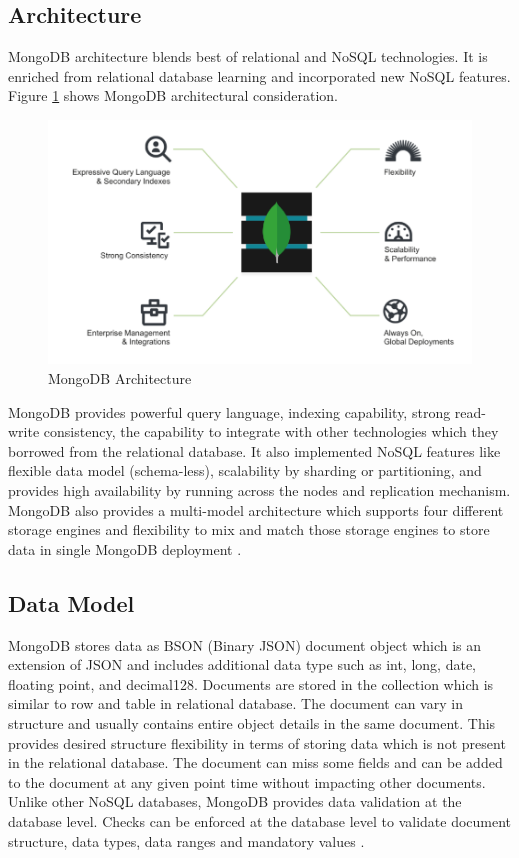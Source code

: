 \documentclass[sigconf]{acmart}
\begin{document}
\subsection{Architecture}
MongoDB architecture blends best of relational and NoSQL technologies. It is enriched from relational database learning and incorporated new NoSQL features.
Figure \ref{f:mongo-arch} shows MongoDB architectural consideration.
\begin{figure}[!ht]
  \centering\includegraphics[width=\columnwidth]{images/mongoArch.PNG}
  \caption{MongoDB Architecture \cite{www-mongo-arch}}\label{f:mongo-arch}
\end{figure}
MongoDB provides powerful query language, indexing capability, strong read-write consistency, the capability to integrate with other technologies which they borrowed from the relational database. It also implemented NoSQL features like flexible data model (schema-less),  scalability by sharding or partitioning, and provides high availability by running across the nodes and replication mechanism. MongoDB also provides a multi-model architecture which supports four different storage engines and flexibility to mix and match those storage engines to store data in single MongoDB deployment \cite{www-mongo-arch}.

\subsection{Data Model}
MongoDB stores data as BSON (Binary JSON) document object which is an extension of JSON and includes additional data type such as int, long, date, floating
point, and decimal128. Documents are stored in the collection which is similar to row and table in relational database. The document can vary in structure and usually contains entire object details in the same document. This provides desired structure flexibility in terms of storing data which is not present in the relational database. The document can miss some fields and can be added to the document at any given point time without impacting other documents. Unlike other NoSQL databases, MongoDB provides data validation at the database level. Checks can be enforced at the database level to validate document structure, data types, data ranges and mandatory values \cite{www-mongo-arch}.
\end{document}
